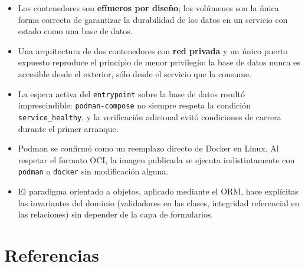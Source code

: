 \documentclass[12pt,a4paper]{article}
\begin{document}
\begin{itemize}
    \item Los contenedores son \textbf{efímeros por diseño}; los volúmenes son la única forma correcta de garantizar la durabilidad de los datos en un servicio con estado como una base de datos.
    \item Una arquitectura de dos contenedores con \textbf{red privada} y un único puerto expuesto reproduce el principio de menor privilegio: la base de datos nunca es accesible desde el exterior, sólo desde el servicio que la consume.
    \item La espera activa del \texttt{entrypoint} sobre la base de datos resultó imprescindible: \texttt{podman-compose} no siempre respeta la condición \texttt{service\_healthy}, y la verificación adicional evitó condiciones de carrera durante el primer arranque.
    \item Podman se confirmó como un reemplazo directo de Docker en Linux. Al respetar el formato OCI, la imagen publicada se ejecuta indistintamente con \texttt{podman} o \texttt{docker} sin modificación alguna.
    \item El paradigma orientado a objetos, aplicado mediante el ORM, hace explícitas las invariantes del dominio (validadores en las clases, integridad referencial en las relaciones) sin depender de la capa de formularios.
\end{itemize}

\section{Referencias}
\end{document}
